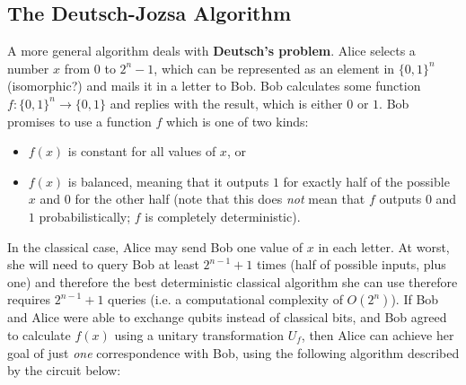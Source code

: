 \documentclass{article}
\theoremstyle{definition}
\begin{document}
\subsection*{The Deutsch-Jozsa Algorithm}
A more general algorithm deals with \textbf{Deutsch's problem}. Alice selects a number $x$ from $0$ to $2^n - 1$, which can be represented as an element in $\{0, 1\}^n$ (isomorphic?) and mails it in a letter to Bob. Bob calculates some function $f: \{0, 1\}^n \longrightarrow \{0, 1\}$ and replies with the result, which is either $0$ or $1$. Bob promises to use a function $f$ which is one of two kinds: 
\begin{itemize}
  \item $f(x)$ is constant for all values of $x$, or
  \item $f(x)$ is balanced, meaning that it outputs $1$ for exactly half of the possible $x$ and $0$ for the other half (note that this does \textit{not} mean that $f$ outputs $0$ and $1$ probabilistically; $f$ is completely deterministic). 
\end{itemize}
In the classical case, Alice may send Bob one value of $x$ in each letter. At worst, she will need to query Bob at least $2^{n-1} + 1$ times (half of possible inputs, plus one) and therefore the best deterministic classical algorithm she can use therefore requires $2^{n-1} + 1$ queries (i.e. a computational complexity of $O(2^n)$). 
If Bob and Alice were able to exchange qubits instead of classical bits, and Bob agreed to calculate $f(x)$ using a unitary transformation $U_f$, then Alice can achieve her goal of just \textit{one} correspondence with Bob, using the following algorithm described by the circuit below: 
\end{document}

